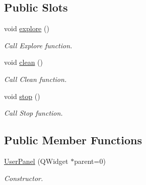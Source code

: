 \subsection*{Public Slots}
\begin{DoxyCompactItemize}
\item 
\mbox{\label{classcleanup_1_1_user_panel_a66a9e5c66aea653517d628c8b9ecc854}} 
void \hyperlink{classcleanup_1_1_user_panel_a66a9e5c66aea653517d628c8b9ecc854}{explore} ()
\begin{DoxyCompactList}\small\item\em Call Explore function. \end{DoxyCompactList}\item 
\mbox{\label{classcleanup_1_1_user_panel_aba5df97a2ea3e7b56eb4df3291103053}} 
void \hyperlink{classcleanup_1_1_user_panel_aba5df97a2ea3e7b56eb4df3291103053}{clean} ()
\begin{DoxyCompactList}\small\item\em Call Clean function. \end{DoxyCompactList}\item 
\mbox{\label{classcleanup_1_1_user_panel_aebd2aebbe8a8e87ad2d8c7618d286f58}} 
void \hyperlink{classcleanup_1_1_user_panel_aebd2aebbe8a8e87ad2d8c7618d286f58}{stop} ()
\begin{DoxyCompactList}\small\item\em Call Stop function. \end{DoxyCompactList}\end{DoxyCompactItemize}
\subsection*{Public Member Functions}
\begin{DoxyCompactItemize}
\item 
\mbox{\label{classcleanup_1_1_user_panel_a728e7c90ec9c6e9714c0660615d705fc}} 
\hyperlink{classcleanup_1_1_user_panel_a728e7c90ec9c6e9714c0660615d705fc}{User\+Panel} (Q\+Widget $\ast$parent=0)
\begin{DoxyCompactList}\small\item\em Constructor. \end{DoxyCompactList}\end{DoxyCompactItemize}
